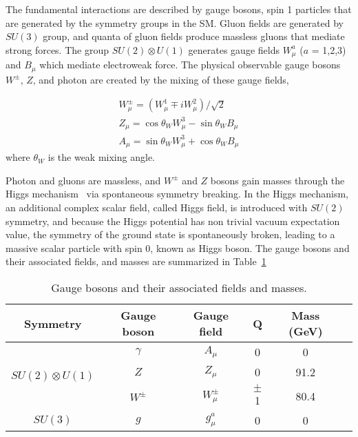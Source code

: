 The fundamental interactions are described by gauge bosons, spin 1 particles that are generated by the symmetry groups in the SM. Gluon fields are generated by $SU(3)$ group, and quanta of gluon fields produce massless gluons that mediate strong forces. The group $SU(2) \otimes U(1)$ generates gauge fields $W^{a}_{\mu}$ ($a$ = 1,2,3) and $B_{\mu}$ which mediate electroweak force. The physical observable gauge bosons $W^{\pm}$, $Z$, and photon are created by the mixing of these gauge fields, 

\begin{equation}
\label{eq:electroweak_mixing}
\begin{split}
	W^{\pm}_{\mu} = (W^{1}_{\mu} \mp iW^{2}_{\mu}) / \sqrt{2} \\
	Z_{\mu} = \cos \theta_{W} W^{3}_{\mu} - \sin\theta_{W} B_{\mu} \\
	A_{\mu} = \sin \theta_{W} W^{3}_{\mu} + \cos\theta_{W} B_{\mu}
\end{split}
\end{equation}
%
where $\theta_{W}$ is the weak mixing angle.

Photon and gluons are massless, and $W^{\pm}$ and $Z$ bosons gain masses through the Higgs mechanism~\cite{PhysRevLett.13.508} via spontaneous symmetry breaking. In the Higgs mechanism, an additional complex scalar field, called Higgs field, is introduced with $SU(2)$ symmetry, and because the Higgs potential has non trivial vacuum expectation value, the symmetry of the ground state is spontaneously broken, leading to a massive scalar particle with spin 0, known as Higgs boson. The gauge bosons and their associated fields, and masses are summarized in Table~\ref{table:gauge_bosons}

\begin{table}[!htb]
  \centering
  \begin{tabular}{c c c c c c}
    \hline
    \hline
	Symmetry	& Gauge boson	& Gauge field	& Q & Mass (GeV) \\
	\hline
	\multirow{3}{*}{$SU(2) \otimes U(1)$} & $\gamma$  &	$A_{\mu}$       & 0	   	& 0 	\\
										  & $Z$		  &	$Z_{\mu}$       & 0	   	& 91.2 	\\
										  & $W^{\pm}$ &	$W_{\mu}^{\pm}$ & $\pm$1  & 80.4 	\\
	\hline
	$SU(3)$								  & $g$		  &	$g^{a}_{\mu}$   &  0		& 0		\\

    \hline
    \hline
  \end{tabular}
  \caption{Gauge bosons and their associated fields and masses.}
  \label{table:gauge_bosons}
\end{table}


